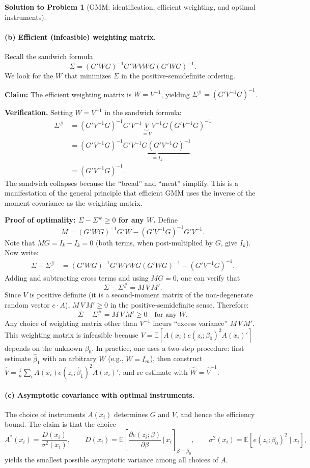 \documentclass[12pt]{article}
\newcommand{\E}{\mathbb E}
\theoremstyle{definition}
\newtheorem{solution}{Solution to Problem}
\begin{document}
\begin{solution}[GMM: identification, efficient weighting, and optimal instruments]
\bigskip
\paragraph{(b) Efficient (infeasible) weighting matrix.} Recall the sandwich formula
\[
\Sigma=(G'WG)^{-1}G'WVWG(G'WG)^{-1}.
\]
We look for the $W$ that minimizes $\Sigma$ in the positive-semidefinite ordering.

\medskip
\noindent\textbf{Claim:} The efficient weighting matrix is $W=V^{-1}$, yielding $\Sigma^\#=(G'V^{-1}G)^{-1}$.

\medskip
\noindent\textbf{Verification.} Setting $W=V^{-1}$ in the sandwich formula:
\begin{align*}
\Sigma^\# &= (G'V^{-1}G)^{-1}G'V^{-1}\underbrace{V}_{=V}V^{-1}G(G'V^{-1}G)^{-1} \\
&= (G'V^{-1}G)^{-1}\underbrace{G'V^{-1}G(G'V^{-1}G)^{-1}}_{=I_k} \\
&= (G'V^{-1}G)^{-1}.
\end{align*}
The sandwich collapses because the ``bread'' and ``meat'' simplify. This is a manifestation of the general principle that efficient GMM uses the inverse of the moment covariance as the weighting matrix.

\medskip
\noindent\textbf{Proof of optimality: $\Sigma-\Sigma^\#\geq 0$ for any $W$.} Define
\[
M = (G'WG)^{-1}G'W - (G'V^{-1}G)^{-1}G'V^{-1}.
\]
Note that $MG=I_k-I_k=0$ (both terms, when post-multiplied by $G$, give $I_k$). Now write:
\begin{align*}
\Sigma - \Sigma^\# &= (G'WG)^{-1}G'WVWG(G'WG)^{-1} - (G'V^{-1}G)^{-1}.
\end{align*}
Adding and subtracting cross terms and using $MG=0$, one can verify that
\[
\Sigma - \Sigma^\# = M\,V\,M'.
\]
Since $V$ is positive definite (it is a second-moment matrix of the non-degenerate random vector $e\cdot A$), $M\,V\,M'\geq 0$ in the positive-semidefinite sense. Therefore:
\[
\boxed{\Sigma - \Sigma^\# = M\,V\,M' \geq 0 \quad\text{for any }W.}
\]
Any choice of weighting matrix other than $V^{-1}$ incurs ``excess variance'' $M\,V\,M'$. This weighting matrix is infeasible because $V=\E[A(x_i)e(z_i;\beta_0)^2 A(x_i)']$ depends on the unknown $\beta_0$. In practice, one uses a two-step procedure: first estimate $\hat\beta_1$ with an arbitrary $W$ (e.g., $W=I_m$), then construct $\hat{V}=\frac{1}{n}\sum_i A(x_i)e(z_i;\hat\beta_1)^2 A(x_i)'$, and re-estimate with $\hat{W}=\hat{V}^{-1}$.

\bigskip
\paragraph{(c) Asymptotic covariance with optimal instruments.} The choice of instruments $A(x_i)$ determines $G$ and $V$, and hence the efficiency bound. The claim is that the choice
\[
A^*(x_i) = \frac{D(x_i)}{\sigma^2(x_i)}, \qquad D(x_i)=\E\!\left[\frac{\partial e(z_i;\beta)}{\partial\beta}\,\bigg|\,x_i\right]_{\!\beta=\beta_0}\!\!\!\!\!\!\!, \qquad \sigma^2(x_i)=\E[e(z_i;\beta_0)^2\mid x_i],
\]
yields the smallest possible asymptotic variance among all choices of $A$.


\end{solution}
\end{document}

